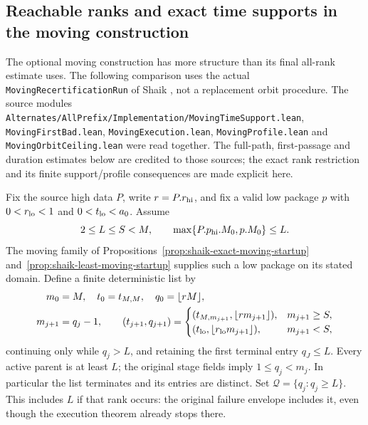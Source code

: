 \documentclass[11pt]{article}
\theoremstyle{remark}\newtheorem{remark}[proposition]{Remark}
\begin{document}
\subsection{Reachable ranks and exact time supports in the moving construction}

The optional moving construction has more structure than its final
all-rank estimate uses. The following comparison uses the actual
\texttt{MovingRecertificationRun} of Shaik
\cite{Shaik2026v324}, not a replacement orbit procedure.
The source modules
\texttt{Alternates/AllPrefix/Implementation/MovingTimeSupport.lean},
\texttt{MovingFirstBad.lean}, \texttt{MovingExecution.lean},
\texttt{MovingProfile.lean} and \texttt{MovingOrbitCeiling.lean}
were read together. The full-path, first-passage and duration estimates
below are credited to those sources; the exact rank restriction and
its finite support/profile consequences are made explicit here.

Fix the source high data \(P\), write \(r=P.r_{\rm hi}\), and fix
a valid low package \(p\) with \(0<r_{\rm lo}<1\) and
\(0<t_{\rm lo}<a_0\). Assume
\[
 2\le L\le S<M,\qquad
 \max\{P.p_{\rm hi}.M_0,p.M_0\}\le L.
\]
The moving family of Propositions~\ref{prop:shaik-exact-moving-startup}
and~\ref{prop:shaik-least-moving-startup} supplies such a low package
on its stated domain. Define a finite deterministic list by
\begin{align}
 m_0&=M,\quad t_0=t_{M,M},\quad q_0=\lfloor rM\rfloor,\nonumber\\
 m_{j+1}&=q_j-1,\qquad
 (t_{j+1},q_{j+1})=
 \begin{cases}
 (t_{M,m_{j+1}},\lfloor r m_{j+1}\rfloor),&m_{j+1}\ge S,\\
 (t_{\rm lo},\lfloor r_{\rm lo}m_{j+1}\rfloor),&m_{j+1}<S,
 \end{cases}
 \label{eq:shaik-moving-reachable-ranks}
\end{align}
continuing only while \(q_j>L\), and retaining the first terminal
entry \(q_J\le L\). Every active parent is at least \(L\);
the original stage fields imply \(1\le q_j<m_j\).
In particular the list terminates and its entries are distinct.
Set \(\mathcal Q=\{q_j:q_j\ge L\}\). This includes \(L\) if that
rank occurs: the original failure envelope includes it, even though
the execution theorem already stops there.
\end{document}
